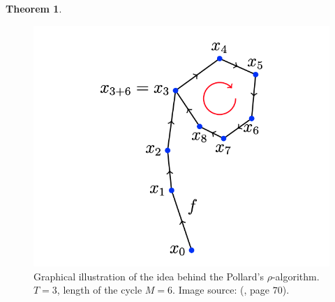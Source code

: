 \documentclass[thesis=M,english]{FITthesis}[2012/10/20]
\theoremstyle{remark}
\theoremstyle{definition}
\newtheorem{theorem}{Theorem}[section]
\begin{document}
\begin{theorem}
 \begin{figure}[h]
 \centering
 \hspace*{-1cm}
 	\includegraphics[width=1\textwidth]{rho.png}
 	\caption[Graphical illustration of the Pollard's $\rho$ collision idea]{Graphical illustration of the idea behind the Pollard's $\rho$-algorithm. $T = 3$, length of the cycle $M = 6$. Image source: (\cite{mky}, page $70$).}
 	\label{rho}
 \end{figure}
 \end{theorem}
\end{document}
